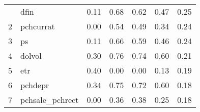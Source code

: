 \documentclass[12pt]{article}
\begin{document}
\begin{footnotesize}
\begin{longtable}{rl|c|c|c|c|c}
    
    \hline
    \hline
    \endfoot
1   & dfin             & 0.11                                                                                      & 0.68                                                                                        & 0.62                                                                                         & 0.47 & 0.25               \\
2   & pchcurrat        & 0.00                                                                                      & 0.54                                                                                        & 0.49                                                                                         & 0.34 & 0.24               \\
3   & ps               & 0.11                                                                                      & 0.66                                                                                        & 0.59                                                                                         & 0.46 & 0.24               \\
4   & dolvol           & 0.30                                                                                      & 0.76                                                                                        & 0.74                                                                                         & 0.60 & 0.21               \\
5   & etr              & 0.40                                                                                      & 0.00                                                                                        & 0.00                                                                                         & 0.13 & 0.19               \\
6   & pchdepr          & 0.34                                                                                      & 0.75                                                                                        & 0.72                                                                                         & 0.60 & 0.18               \\
7   & pchsale\_pchrect & 0.00                                                                                      & 0.36                                                                                        & 0.38                                                                                         & 0.25 & 0.18               \\

\end{longtable}
\end{footnotesize}
\end{document}
